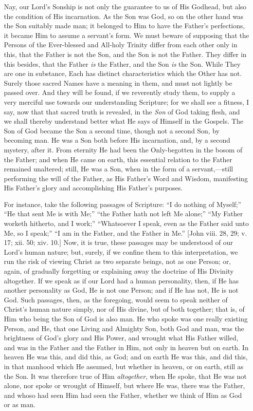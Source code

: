 Nay, our Lord's Sonship is not only the guarantee to us of His
Godhead, but also the condition of His incarnation. As the Son was God,
so on the other hand was the Son suitably made man; it belonged to Him
to have the Father's perfections, it became Him to assume a servant's
form. We must beware of supposing that the Persons of the Ever-blessed
and All-holy Trinity differ from each other only in this, that the
Father is not the Son, and the Son is not the Father. They differ in
this besides, that the Father \emph{is} the Father, and the Son \emph{is}
the Son. While They are one in substance, Each has distinct
characteristics which the Other has not. Surely those sacred Names have
a meaning in them, and must not lightly be passed over. And they will be
found, if we reverently study them, to supply a very merciful use
towards our understanding Scripture; for we shall see a fitness, I say,
now that that sacred truth is revealed, in the \emph{Son} of God taking
flesh, and we shall thereby understand better what He says of Himself in
the Gospels. The Son of God became the Son a second time, though not a
second Son, by becoming man. He was a Son both before His incarnation,
and, by a second mystery, after it. From eternity He had been the
Only-begotten in the bosom of the Father; and when He came on earth,
this essential relation to the Father remained unaltered; still, He was
a Son, when in the form of a servant,—still performing the will of the
Father, as His Father's Word and Wisdom, manifesting His Father's glory
and accomplishing His Father's purposes.

For instance, take the following passages of Scripture: ``I do
nothing of Myself;'' ``He that sent Me is with Me;''
``the Father hath not left Me alone;'' ``My Father worketh
hitherto, and I work;'' ``Whatsoever I speak, even as the Father
said unto Me, so I speak;'' ``I am in the Father, and the Father
in Me.'' [John viii. 28, 29; v. 17; xii. 50; xiv. 10.] Now, it is
true, these passages may be understood of our Lord's human nature; but,
surely, if we confine them to this interpretation, we run the risk of
viewing Christ as two separate beings, not as one Person; or, again, of
gradually forgetting or explaining away the doctrine of His Divinity
altogether. If we speak as if our Lord had a human personality, then, if
He has another personality as God, He is not one Person; and if He has
not, He is not God. Such passages, then, as the foregoing, would seem to
speak neither of Christ's human nature simply, nor of His divine, but of
both together; that is, of Him who being the Son of God is also man. He
who spoke was one really existing Person, and He, that one Living and
Almighty Son, both God and man, was the brightness of God's glory and
His Power, and wrought what His Father willed, and was in the Father and
the Father in Him, not only in heaven but on earth. In heaven He was
this, and did this, as God; and on earth He was this, and did this, in
that manhood which He assumed, but whether in heaven, or on earth, still
as the Son. It was therefore true of Him \emph{altogether}, when He spoke, that
He was not alone, nor spoke or wrought of Himself, but where He was,
there was the Father, and whoso had seen Him had seen the Father,
whether we think of Him as God or as man.

